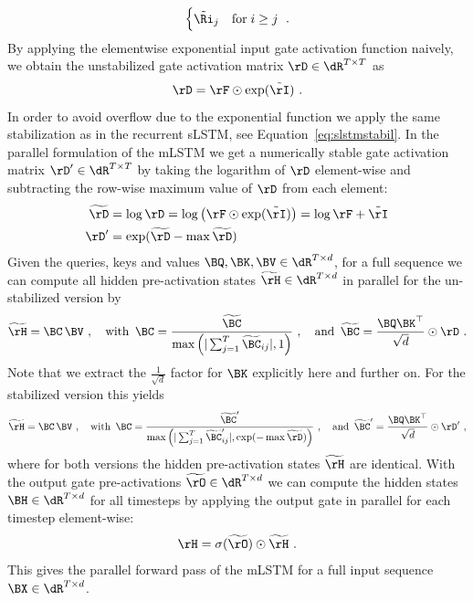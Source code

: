\documentclass[dvipsnames]{article}
\begin{document}
\begin{appendix}
\begin{equation}
\begin{cases}
        \tilde{\Ri}_j & \text{for} \; i \geq j
    \end{cases} \ .
\end{equation}
By applying the elementwise exponential input gate activation function naively, we obtain the unstabilized gate activation matrix $\bm{\rD} \in \dR^{T \times T}$ as
\begin{equation}
    \bm{\rD} = \bm{\rF} \odot \exp(\tilde{\bm{\rI}}) \ .
\end{equation}
In order to avoid overflow due to the exponential function we apply the same stabilization as in the recurrent sLSTM, see Equation~\ref{eq:slstmstabil}.
In the parallel formulation of the mLSTM we get a numerically stable gate activation matrix $\bm{\rD}' \in \dR^{T \times T}$
by taking the logarithm of $\bm{\rD}$ element-wise and subtracting the row-wise maximum value of $\bm{\rD}$ from each element:
\begin{align}
    \widetilde{\bm{\rD}} & = \log \bm{\rD} = \log \left(\bm{\rF} \odot \exp(\tilde{\bm{\rI}})\right) = \log \bm{\rF} + \tilde{\bm{\rI}} \\
    \bm{\rD}'            & = \exp(\widetilde{\bm{\rD}} - \max \widetilde{\bm{\rD}})
\end{align}
Given the queries, keys and values $\BQ, \BK, \BV \in \dR^{T \times d}$, for a full sequence we can compute all hidden pre-activation states $\widetilde{\bm{\rH}} \in \dR^{T \times d}$
in parallel for the un-stabilized version by
\begin{equation}
    \widetilde{\bm{\rH}} = \BC \, \BV \ , \quad \text{with} \, \, \, \BC = \frac{\widetilde{\BC}}{\max \left( | \sum_{j=1}^{T} \widetilde{\BC}_{ij}|, 1\right)} \ , \quad
    \text{and} \, \, \, \widetilde{\BC} = \frac{\BQ \BK^\top }{\sqrt{d}} \odot \bm{\rD} \ .
\end{equation}
Note that we extract the $\frac{1}{\sqrt{d}}$ factor for $\BK$ explicitly here and further on. For the stabilized version this yields
\begin{equation}
    \widetilde{\bm{\rH}} = \BC \, \BV \ , \quad \text{with} \, \, \, \BC = \frac{\widetilde{\BC}'}{\max \left( | \sum_{j=1}^{T} \widetilde{\BC}'_{ij}|, \exp(-\max \widetilde{\bm{\rD}})\right)} \ , \quad
    \text{and} \, \, \, \widetilde{\BC}' = \frac{\BQ \BK^\top}{\sqrt{d}} \odot \bm{\rD}' \ ,
\end{equation}
where for both versions the hidden pre-activation states $\widetilde{\bm{\rH}}$ are identical.
With the output gate pre-activations $\widetilde{\bm{\rO}} \in \dR^{T \times d}$ we can compute the hidden states $\BH \in \dR^{T \times d}$ for all timesteps
by applying the output gate in parallel for each timestep element-wise:
\begin{equation}
    \bm{\rH} = \sigma(\widetilde{\bm{\rO}}) \odot \widetilde{\bm{\rH}} \ .
\end{equation}
This gives the parallel forward pass of the mLSTM for a full input sequence $\BX \in \dR^{T \times d}$.

\end{appendix}
\end{document}
